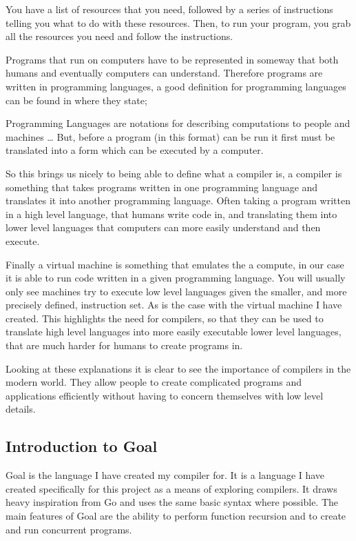 You have a list of resources that you need, followed by a series of instructions telling you what to do with these resources. Then, to run your program, you grab all the resources you need and follow the instructions.

Programs that run on computers have to be represented in someway that both humans and eventually computers can understand.  Therefore programs are written in programming languages, a good definition for programming languages can be found in  \cite[p,~1]{Comp2007}  where they state;

\begin{displayquote}
Programming Languages are notations for describing computations to people and machines … But, before a program (in this format) can be run it first must be translated into a form which can be executed by a computer.
\end{displayquote}

So this brings us nicely to being able to define what a compiler is, a compiler is something that takes programs written in one programming language and translates it into another programming language. Often taking a program written in a high level language, that humans write code in, and translating them into lower level languages that computers can more easily understand and then execute.

Finally a virtual machine is something that emulates the a compute, in our case it is able to run code written in a given programming language. You will usually only see machines try to execute low level languages given the smaller, and more precisely defined, instruction set. As is the case with the virtual machine I have created. This highlights the need for compilers, so that they can be used to translate high level languages into more easily executable lower level languages, that are much harder for humans to create programs in. 

Looking at these explanations it is clear to see the importance of compilers in the modern world. They allow people to create complicated programs and applications efficiently without having to concern themselves with low level details.

\subsection{Introduction to Goal}

Goal is the language I have created my compiler for. It is a language I have created specifically for this project as a means of exploring compilers. It draws heavy inspiration from Go and uses the same basic syntax where possible. The main features of Goal are the ability to perform function recursion and to create and run concurrent programs.

